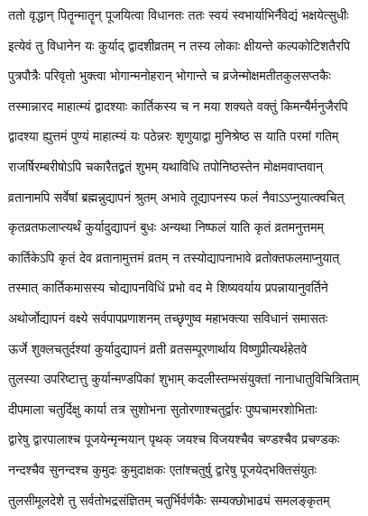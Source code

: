 \twolineshloka
{ततो वृद्धान् पितॄन्मातॄन् पूजयित्वा विधानतः}
{ततः स्वयं स्वभार्याभिर्नैवेद्यं भक्षयेत्सुधीः} %

\twolineshloka
{इत्येवं तु विधानेन यः कुर्याद् द्वादशीव्रतम्}
{न तस्य लोकाः क्षीयन्ते कल्पकोटिशतैरपि} %

\twolineshloka
{पुत्रपौत्रैः परिवृतो भुक्त्वा भोगान्मनोहरान्}
{भोगान्ते च व्रजेन्मोक्षमतीतकुलसप्तकैः} %

\twolineshloka
{तस्मान्नारद माहात्म्यं द्वादश्याः कार्तिकस्य च}
{न मया शक्यते वक्तुं किमन्यैर्मनुजैरपि} %

\twolineshloka
{द्वादश्या ह्युत्तमं पुण्यं माहात्म्यं यः पठेन्नरः}
{शृणुयाद्वा मुनिश्रेष्ठ स याति परमां गतिम्} %

\twolineshloka
{राजर्षिरम्बरीषोऽपि चकारैतद्व्रतं शुभम्}
{यथाविधि तपोनिष्ठस्तेन मोक्षमवाप्तवान्} %





\twolineshloka
{व्रतानामपि सर्वेषां ब्रह्मन्नुद्यापनं श्रुतम्}
{अभावे तूद्यापनस्य फलं नैवाऽऽप्नुयात्क्वचित्} %

\twolineshloka
{कृतव्रतफलाप्त्यर्थं कुर्यादुद्यापनं बुधः}
{अन्यथा निष्फलं याति कृतं व्रतमनुत्तमम्} %

\twolineshloka
{कार्तिकेऽपि कृतं देव व्रतानामुत्तमं व्रतम्}
{न तस्योद्यापनाभावे व्रतोक्तफलमाप्नुयात्} %

\twolineshloka
{तस्मात् कार्तिकमासस्य चोद्यापनविधिं प्रभो}
{वद मे शिष्यवर्याय प्रपन्नायानुवर्तिने} %


\twolineshloka
{अथोर्जोद्यापनं वक्ष्ये सर्वपापप्रणाशनम्}
{तच्छृणुष्व महाभक्त्या सविधानं समासतः} %

\twolineshloka
{ऊर्जे शुक्लचतुर्दश्यां कुर्यादुद्यापनं व्रती}
{व्रतसम्पूरणार्थाय विष्णुप्रीत्यर्थहेतवे} %

\twolineshloka
{तुलस्या उपरिष्टात्तु कुर्यान्मण्डपिकां शुभाम्}
{कदलीस्तम्भसंयुक्तां नानाधातुविचित्रिताम्} %

\twolineshloka
{दीपमाला चतुर्दिक्षु कार्या तत्र सुशोभना}
{सुतोरणाश्चतुर्द्वारः पुष्पचामरशोभिताः} %

\twolineshloka
{द्वारेषु द्वारपालाश्च पूजयेन्मृन्मयान् पृथक्}
{जयश्च विजयश्चैव चण्डश्चैव प्रचण्डकः} %

\twolineshloka
{नन्दश्चैव सुनन्दश्च कुमुदः कुमुदाक्षकः}
{एतांश्चतुर्षु द्वारेषु पूजयेद्भक्तिसंयुतः} %

\twolineshloka
{तुलसीमूलदेशे तु सर्वतोभद्रसंज्ञितम्}
{चतुर्भिर्वर्णकैः सम्यक्छोभाढ्यं समलङ्कृतम्} %

